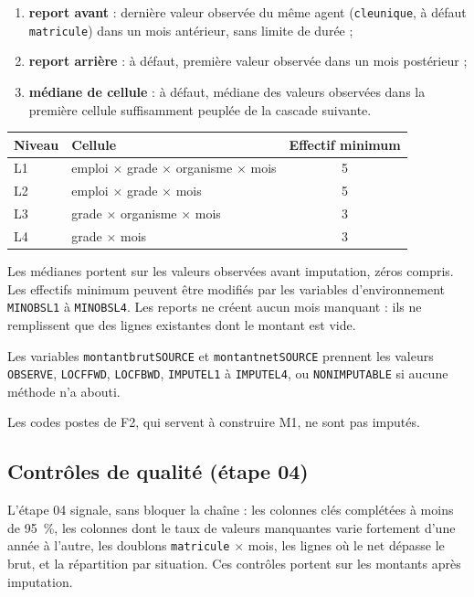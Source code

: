 \documentclass[12pt,a4paper,french]{article}
\renewcommand{\_}{\underscoreorigine\allowbreak}
\begin{document}
\begin{enumerate}
    \item \textbf{report avant} : dernière valeur observée du même agent (\texttt{cle\_unique}, à défaut \texttt{matricule}) dans un mois antérieur, sans limite de durée ;
    \item \textbf{report arrière} : à défaut, première valeur observée dans un mois postérieur ;
    \item \textbf{médiane de cellule} : à défaut, médiane des valeurs observées dans la première cellule suffisamment peuplée de la cascade suivante.
\end{enumerate}

\begin{center}
\begin{tabular}{llc}
    \toprule
    \textbf{Niveau} & \textbf{Cellule} & \textbf{Effectif minimum} \\
    \midrule
    L1 & emploi $\times$ grade $\times$ organisme $\times$ mois & 5 \\
    L2 & emploi $\times$ grade $\times$ mois & 5 \\
    L3 & grade $\times$ organisme $\times$ mois & 3 \\
    L4 & grade $\times$ mois & 3 \\
    \bottomrule
\end{tabular}
\end{center}

Les médianes portent sur les valeurs observées avant imputation, zéros compris. Les effectifs minimum peuvent être modifiés par les variables d'environnement \texttt{MIN\_OBS\_L1} à \texttt{MIN\_OBS\_L4}. Les reports ne créent aucun mois manquant : ils ne remplissent que des lignes existantes dont le montant est vide.

Les variables \texttt{montant\_brut\_SOURCE} et \texttt{montant\_net\_SOURCE} prennent les valeurs \texttt{OBSERVE}, \texttt{LOCF\_FWD}, \texttt{LOCF\_BWD}, \texttt{IMPUTE\_L1} à \texttt{IMPUTE\_L4}, ou \texttt{NON\_IMPUTABLE} si aucune méthode n'a abouti.

Les codes postes de F2, qui servent à construire M1, ne sont pas imputés.

\subsection{Contrôles de qualité (étape 04)}

L'étape 04 signale, sans bloquer la chaîne : les colonnes clés complétées à moins de 95~\%, les colonnes dont le taux de valeurs manquantes varie fortement d'une année à l'autre, les doublons \texttt{matricule} $\times$ mois, les lignes où le net dépasse le brut, et la répartition par situation. Ces contrôles portent sur les montants après imputation.
\end{document}
